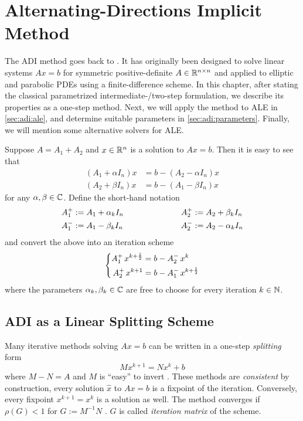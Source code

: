 \chapter{Alternating-Directions Implicit Method}

The \ac{ADI} method goes back to \cite{Peaceman1955}.
It has originally been designed to solve linear systems
$Ax=b$
for symmetric positive-definite $A\in\mathbb{R}^{n\times n}$
and applied to elliptic and parabolic \acp{PDE} using a finite-difference scheme.
In this chapter, after stating the classical parametrized intermediate-/two-step formulation,
we describe its properties as a one-step method.
Next, we will apply the method to \ac{ALE} in \autoref{sec:adi:ale},
and determine suitable parameters in \autoref{sec:adi:parameters}.
Finally, we will mention some alternative solvers for \ac{ALE}.

Suppose $A=A_1+A_2$ and $x\in\mathbb{R}^n$ is a solution to $Ax=b$.
Then it is easy to see that
\begin{align*}
  (A_1 + \alpha I_n)x &= b - (A_2 - \alpha I_n) x \\
  (A_2 + \beta I_n)x &= b - (A_1 - \beta I_n) x
\end{align*}
for any $\alpha, \beta \in\mathbb{C}$.
Define the short-hand notation
\begin{equation}
\label{eq:adi:shorthand}
\begin{aligned}
  \Aip  &:= A_1 + \alpha_k I_n &
  \qquad\qquad\qquad %
  \Aiip &:= A_2 + \beta_k  I_n \\
  \Aim  &:= A_1 - \beta_k  I_n &
  \Aiim &:= A_2 - \alpha_k I_n
\end{aligned}
\end{equation}
and convert the above into an iteration scheme
\begin{equation}
  \label{eq:adi:general2step}
  \left\{
  \begin{aligned}
    \mathop{A_1^+}  x^{k+\frac{1}{2}} &= b - \mathop{A_2^-} x^k \\
    \mathop{A_2^+} x^{k+1}           &= b - \mathop{A_1^-} x^{k+\frac{1}{2}}
  \end{aligned}
  \right.
\end{equation}
where the parameters $\alpha_k, \beta_k \in\mathbb{C}$ are free to choose for every iteration $k\in\mathbb{N}$.

\section{ADI as a Linear Splitting Scheme}
\label{sec:adi:1step}

Many iterative methods solving $Ax=b$ can be written in a one-step \emph{splitting} form
\begin{equation}
\label{eq:adi:1nf}
  Mx^{k+1} = Nx^k + b
\end{equation}
where $M-N = A$ and $M$ is \enquote{easy} to invert \cite[Section~11.2.3]{Golub2013}.
These methods are \emph{consistent} by construction,
\ie every solution $\hat x$ to $Ax=b$ is a fixpoint of the iteration.
Conversely, every fixpoint $x^{k+1} = x^k$ is a solution as well.
The method converges if $\rho(G) < 1$ for $G:=M^{-1}N$ \cite[Theorem~11.2.1]{Golub2013}.
$G$ is called \emph{iteration matrix} of the scheme.

